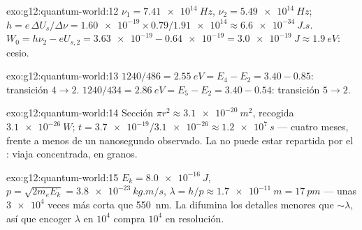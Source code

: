 \begin{solution}{exo:g12:quantum-world:12}
$\nu_1 = \qty{7.41e14}{Hz}$, $\nu_2 = \qty{5.49e14}{Hz}$;
$h = e\,\Delta U_s/\Delta\nu = \num{1.60e-19} \times 0.79 /
\num{1.91e14} \approx \qty{6.6e-34}{J.s}$.
$W_0 = h\nu_2 - eU_{s,2} = \num{3.63e-19} - \num{0.64e-19} =
\qty{3.0e-19}{J} \approx \qty{1.9}{eV}$: cesio.
\end{solution}

\begin{solution}{exo:g12:quantum-world:13}
$1240/486 = \qty{2.55}{eV} = E_4 - E_2 = 3.40 - 0.85$: transición
$4 \to 2$. $1240/434 = \qty{2.86}{eV} = E_5 - E_2 = 3.40 - 0.54$:
transición $5 \to 2$.
\end{solution}

\begin{solution}{exo:g12:quantum-world:14}
Sección  $\pi r^2 \approx \qty{3.1e-20}{m^2}$, 
recogida $\qty{3.1e-26}{W}$;
$t = \num{3.7e-19}/\num{3.1e-26} \approx \qty{1.2e7}{s}$ --- cuatro
meses, frente a menos de un nanosegundo observado. La  no puede
estar repartida por el : viaja concentrada, en granos.
\end{solution}

\begin{solution}{exo:g12:quantum-world:15}
$E_k = \qty{8.0e-16}{J}$,
$p = \sqrt{2m_e E_k} = \qty{3.8e-23}{kg.m/s}$,
$\lambda = h/p \approx \qty{1.7e-11}{m} = \qty{17}{pm}$ --- unas
$\num{3e4}$ veces más corta que \qty{550}{nm}. La  difumina
los detalles menores que $\sim\lambda$, así que encoger $\lambda$ en
$10^4$ compra $10^4$ en resolución.
\end{solution}

